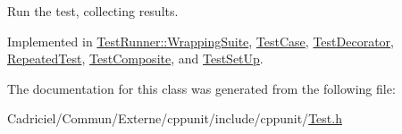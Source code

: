 Run the test, collecting results. 



Implemented in \hyperlink{class_test_runner_1_1_wrapping_suite_aa486bfea64b60206ac1d8fbb006f2f64}{Test\-Runner\-::\-Wrapping\-Suite}, \hyperlink{class_test_case_a6bc50d62de5b2d0addf9b0167e34b134}{Test\-Case}, \hyperlink{class_test_decorator_a64dd70aae76f31f2e2f7b5ac84a8e829}{Test\-Decorator}, \hyperlink{class_repeated_test_a6faffcd29b619305a75dd4c1995beaad}{Repeated\-Test}, \hyperlink{class_test_composite_a2ba14045b1a1e83963dd4db746b04dfd}{Test\-Composite}, and \hyperlink{class_test_set_up_aa3f79125254c288d6effee6df8e7d5fb}{Test\-Set\-Up}.



The documentation for this class was generated from the following file\-:\begin{DoxyCompactItemize}
\item 
Cadriciel/\-Commun/\-Externe/cppunit/include/cppunit/\hyperlink{_test_8h}{Test.\-h}\end{DoxyCompactItemize}
